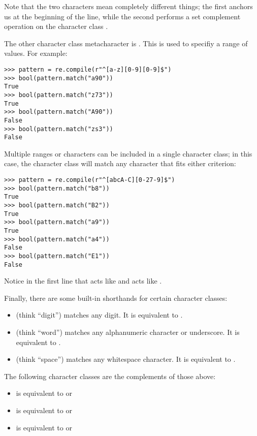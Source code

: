 Note that the two  characters mean completely different things; the first \mbox{} anchors us at the beginning of the line, while the second  performs a set complement operation on the character class .

The other character class metacharacter is . This is used to specifiy a range of values.
For example:
\begin{lstlisting}
>>> pattern = re.compile(r"^[a-z][0-9][0-9]$")
>>> bool(pattern.match("a90"))
True
>>> bool(pattern.match("z73"))
True
>>> bool(pattern.match("A90"))
False
>>> bool(pattern.match("zs3"))
False
\end{lstlisting}

Multiple ranges or characters can be included in a single character class; in this case, the character class will match any character that fits either criterion:
\begin{lstlisting}
>>> pattern = re.compile(r"^[abcA-C][0-27-9]$")
>>> bool(pattern.match("b8"))
True
>>> bool(pattern.match("B2"))
True
>>> bool(pattern.match("a9"))
True
>>> bool(pattern.match("a4"))
False
>>> bool(pattern.match("E1"))
False
\end{lstlisting}
Notice in the first line that \li{[abcA-C]} acts like \li{[a|b|c|(A-C)]} and \li{[0-27-9]} acts like \li{[(0-2)|(7-9)]}.

Finally, there are some built-in shorthands for certain character classes: 
\begin{itemize}
    \item {} (think ``digit'') matches any digit. It is equivalent to .
    \item {} (think ``word'') matches any alphanumeric character or underscore. It is equivalent to .
    \item {} (think ``space'') matches any whitespace character. It is equivalent to .
\end{itemize}
The following character classes are the complements of those above:
\begin{itemize}
    \item {} is equivalent to  or 
    \item {} is equivalent to  or 
    \item {} is equivalent to  or 
\end{itemize}

